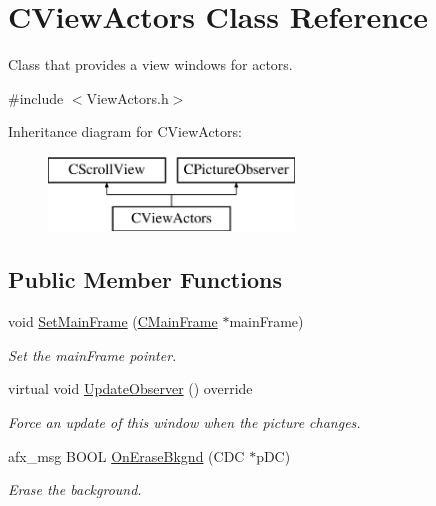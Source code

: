 \hypertarget{class_c_view_actors}{\section{C\+View\+Actors Class Reference}
\label{class_c_view_actors}
}


Class that provides a view windows for actors.  




{\ttfamily \#include $<$View\+Actors.\+h$>$}

Inheritance diagram for C\+View\+Actors\+:\begin{figure}[H]
\begin{center}
\leavevmode
\includegraphics[height=2.000000cm]{class_c_view_actors}
\end{center}
\end{figure}
\subsection*{Public Member Functions}
\begin{DoxyCompactItemize}
\item 
void \hyperlink{class_c_view_actors_a6f68ae9e71f6a195502464bf34b3e724}{Set\+Main\+Frame} (\hyperlink{class_c_main_frame}{C\+Main\+Frame} $\ast$main\+Frame)
\begin{DoxyCompactList}\small\item\em Set the main\+Frame pointer. \end{DoxyCompactList}\item 
\hypertarget{class_c_view_actors_a5014f8c616850b8e874dee895b2ba698}{virtual void \hyperlink{class_c_view_actors_a5014f8c616850b8e874dee895b2ba698}{Update\+Observer} () override}\label{class_c_view_actors_a5014f8c616850b8e874dee895b2ba698}

\begin{DoxyCompactList}\small\item\em Force an update of this window when the picture changes. \end{DoxyCompactList}\item 
afx\+\_\+msg B\+O\+O\+L \hyperlink{class_c_view_actors_a561f4be212bd5df4a667c2cb0b23e472}{On\+Erase\+Bkgnd} (C\+D\+C $\ast$p\+D\+C)
\begin{DoxyCompactList}\small\item\em Erase the background. \end{DoxyCompactList}\end{DoxyCompactItemize}
